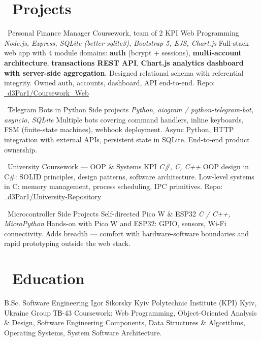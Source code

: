 \documentclass[10pt,a4paper,sans]{moderncv}
\begin{document}
\section{\faFolderOpen\ Projects}

        {\faChartLine\ Personal Finance Manager}
        {Coursework, team of 2}
        {KPI Web Programming}
        {\textit{Node.js, Express, SQLite (better-sqlite3), Bootstrap 5, EJS, Chart.js}}
        {\small Full-stack web app with 4 module domains: \textbf{auth} (bcrypt + sessions), \textbf{multi-account architecture}, \textbf{transactions REST API}, \textbf{Chart.js analytics dashboard with server-side aggregation}. Designed relational schema with referential integrity. Owned auth, accounts, dashboard, API end-to-end. Repo: \href{https://github.com/d3Par1/Coursework_Web}{\faGithub\ d3Par1/Coursework\_Web}}

        {\faRobot\ Telegram Bots in Python}
        {Side projects}
        {}
        {\textit{Python, aiogram / python-telegram-bot, asyncio, SQLite}}
        {\small Multiple bots covering command handlers, inline keyboards, FSM (finite-state machines), webhook deployment. Async Python, HTTP integration with external APIs, persistent state in SQLite. End-to-end product ownership.}

        {\faGraduationCap\ University Coursework --- OOP \& Systems}
        {KPI}
        {}
        {\textit{C\#, C, C++}}
        {\small OOP design in C\#: SOLID principles, design patterns, software architecture. Low-level systems in C: memory management, process scheduling, IPC primitives. Repo: \href{https://github.com/d3Par1/University-Repository}{\faGithub\ d3Par1/University-Repository}}

        {\faMicrochip\ Microcontroller Side Projects}
        {Self-directed}
        {Pico W \& ESP32}
        {\textit{C / C++, MicroPython}}
        {\small Hands-on with Pico W and ESP32: GPIO, sensors, Wi-Fi connectivity. Adds breadth --- comfort with hardware-software boundaries and rapid prototyping outside the web stack.}

\section{\faUniversity\ Education}
        {B.Sc. Software Engineering}
        {Igor Sikorsky Kyiv Polytechnic Institute (KPI)}
        {Kyiv, Ukraine}
        {Group \foreignlanguage{ukrainian}{ТВ}-43}
        {\small Coursework: Web Programming, Object-Oriented Analysis \& Design, Software Engineering Components, Data Structures \& Algorithms, Operating Systems, System Software Architecture.}
\end{document}
